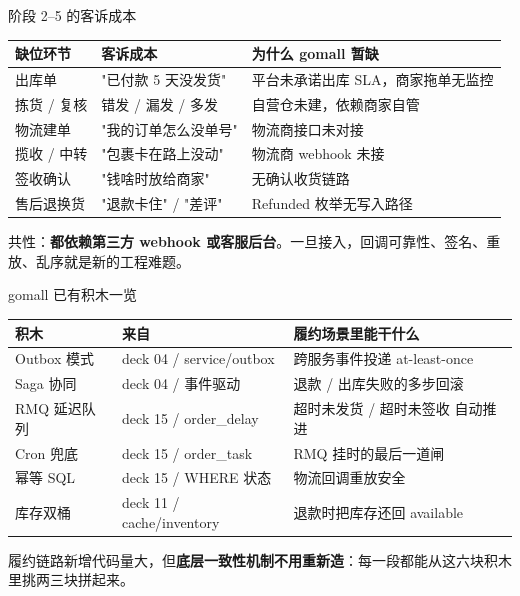 \begin{frame}{阶段 2--5 的客诉成本}
\begin{tabular}{@{}llp{5.2cm}@{}}
\toprule
缺位环节 & 客诉成本 & 为什么 gomall 暂缺 \\
\midrule
出库单        & "已付款 5 天没发货"     & 平台未承诺出库 SLA，商家拖单无监控 \\
拣货 / 复核   & 错发 / 漏发 / 多发      & 自营仓未建，依赖商家自管 \\
物流建单      & "我的订单怎么没单号"    & 物流商接口未对接 \\
揽收 / 中转   & "包裹卡在路上没动"      & 物流商 webhook 未接 \\
签收确认      & "钱啥时放给商家"        & 无确认收货链路 \\
售后退换货    & "退款卡住" / "差评"     & Refunded 枚举无写入路径 \\
\bottomrule
\end{tabular}
\vspace{1mm}
\small 共性：\textbf{都依赖第三方 webhook 或客服后台}。一旦接入，回调可靠性、签名、重放、乱序就是新的工程难题。
\end{frame}

\begin{frame}{gomall 已有积木一览}
\begin{tabular}{@{}lll@{}}
\toprule
积木 & 来自 & 履约场景里能干什么 \\
\midrule
Outbox 模式       & deck 04 / service/outbox & 跨服务事件投递 at-least-once \\
Saga 协同         & deck 04 / 事件驱动        & 退款 / 出库失败的多步回滚 \\
RMQ 延迟队列      & deck 15 / order\_delay   & 超时未发货 / 超时未签收 自动推进 \\
Cron 兜底         & deck 15 / order\_task    & RMQ 挂时的最后一道闸 \\
幂等 SQL          & deck 15 / WHERE 状态     & 物流回调重放安全 \\
库存双桶          & deck 11 / cache/inventory& 退款时把库存还回 available \\
\bottomrule
\end{tabular}
\vspace{1mm}
\small 履约链路新增代码量大，但\textbf{底层一致性机制不用重新造}：每一段都能从这六块积木里挑两三块拼起来。
\end{frame}


